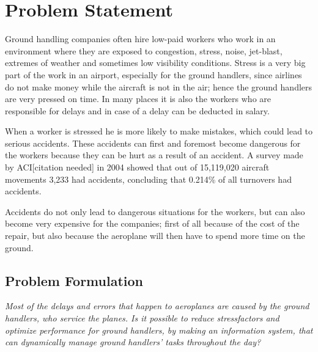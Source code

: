 \section{Problem Statement}

Ground handling companies often hire low-paid workers who work in an environment where they are exposed to congestion, stress, noise, jet-blast, extremes of weather and sometimes low visibility conditions. Stress is a very big part of the work in an airport, especially for the ground handlers, since airlines do not make money while the aircraft is not in the air; hence the ground handlers are very pressed on time.  In many places it is also the workers who are responsible for delays and in case of a delay can be deducted in salary.

When a worker is stressed he is more likely to make mistakes, which could lead to serious accidents. These accidents can first and foremost become dangerous for the workers because they can be hurt as a result of an accident. A survey made by ACI[citation needed] in 2004 showed that out of 15,119,020 aircraft movements 3,233 had accidents, concluding that 0.214\% of all turnovers had accidents.

Accidents do not only lead to dangerous situations for the workers, but can also become very expensive for the companies; first of all because of the cost of the repair, but also because the aeroplane will then have to spend more time on the ground.
\subsection{Problem Formulation}
\begin{center}
\textit{Most of the delays and errors that happen to aeroplanes are caused by the ground handlers, who service the planes. Is it possible to reduce stressfactors and optimize performance for ground handlers, by making an information system, that can dynamically manage ground handlers' tasks throughout the day?}
\end{center}
